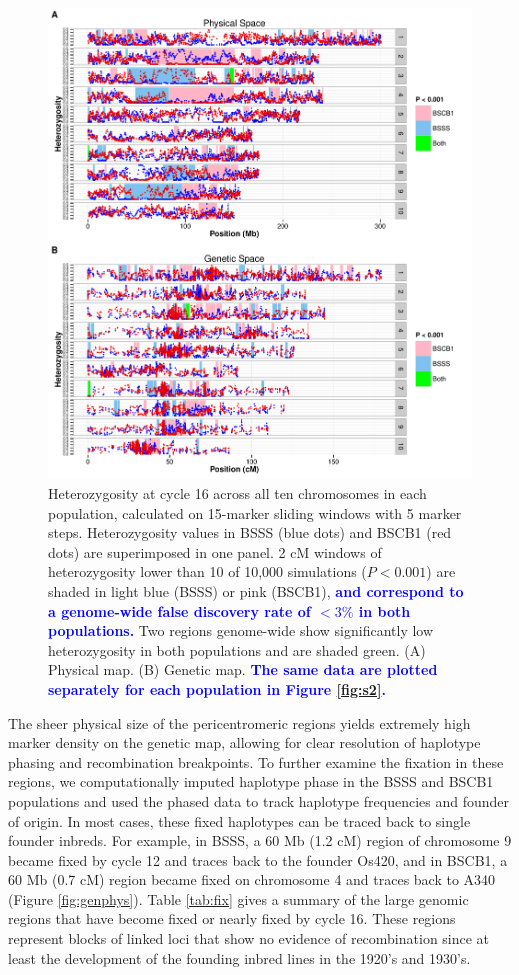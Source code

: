 \documentclass[twocolumn,twoside,letterpaper]{article}
\newcommand{\rev}[1]{\textcolor{blue}{\bf #1}}
\begin{document}
\begin{figure}[tb]   
  \begin{center}
\includegraphics[width=0.7\linewidth]{fig_S2_combined}
   \caption{Heterozygosity at cycle 16 across all ten chromosomes in each population, calculated on 15-marker sliding windows with 5 marker steps. Heterozygosity values in BSSS (blue dots) and BSCB1 (red dots) are superimposed in one panel. 2 cM windows of heterozygosity lower than 10 of 10,000 simulations ($P<0.001$) are shaded in light blue (BSSS) or pink (BSCB1), \rev{and correspond to a genome-wide false discovery rate of $<3\%$ in both populations.} Two regions genome-wide show significantly low heterozygosity in both populations and are shaded green. (A) Physical map. (B) Genetic map. \rev{The same data are plotted separately for each population in Figure \ref{fig:s2}.}} 
    \label{fig:heterotic}
  \end{center}
\end{figure}

The sheer physical size of the pericentromeric regions yields extremely high marker density on the genetic map, allowing for clear resolution of haplotype phasing and recombination breakpoints. 
To further examine the fixation in these regions, we computationally imputed haplotype phase in the BSSS and BSCB1 populations and used the phased data to track haplotype frequencies and founder of origin. 
In most cases, these fixed haplotypes can be traced back to single founder inbreds. 
For example, in BSSS, a 60 Mb (1.2 cM) region of chromosome 9 became fixed by cycle 12 and traces back to the founder Os420, and in BSCB1, a 60 Mb (0.7 cM) region became fixed on chromosome 4 and traces back to A340 (Figure \ref{fig:genphys}).
Table \ref{tab:fix} gives a summary of the large genomic regions that have become fixed or nearly fixed by cycle 16. 
These regions represent blocks of linked loci that show no evidence of recombination since at least the development of the founding inbred lines in the 1920’s and 1930’s.
	
\end{document}
